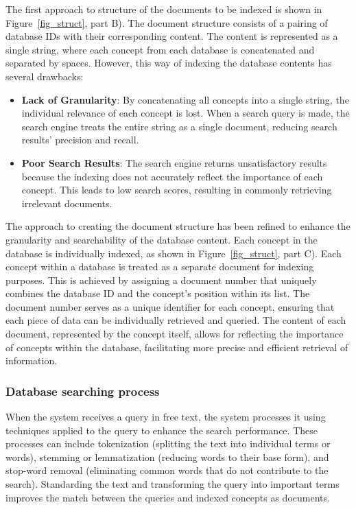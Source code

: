The first approach to structure of the documents to be indexed is shown in Figure~\ref{fig_struct}, part B). The document structure consists of a pairing of database IDs with their corresponding content. The content is represented as a single string, where each concept from each database is concatenated and separated by spaces. However, this way of indexing the database contents has several drawbacks: 

\begin{itemize}
    \item \textbf{Lack of Granularity}: By concatenating all concepts into a single string, the individual relevance of each concept is lost. When a search query is made, the search engine treats the entire string as a single document, reducing search results' precision and recall.
    \item \textbf{Poor Search Results}: The search engine returns unsatisfactory results because the indexing does not accurately reflect the importance of each concept. This leads to low search scores, resulting in commonly retrieving irrelevant documents.
\end{itemize}

The approach to creating the document structure has been refined to enhance the granularity and searchability of the database content. Each concept in the database is individually indexed, as shown in Figure~\ref{fig_struct}, part C). Each concept within a database is treated as a separate document for indexing purposes. This is achieved by assigning a document number that uniquely combines the database ID and the concept's position within its list. The document number serves as a unique identifier for each concept, ensuring that each piece of data can be individually retrieved and queried. The content of each document, represented by the concept itself, allows for reflecting the importance of concepts within the database, facilitating more precise and efficient retrieval of information.


\subsubsection{Database searching process}
\label{searchprocess}

When the {\ir} system receives a query in free text, the system processes it using {\nlp} techniques applied to the query to enhance the search performance. These processes can include tokenization (splitting the text into individual terms or words), stemming or lemmatization (reducing words to their base form), and stop-word removal (eliminating common words that do not contribute to the search). Standarding the text and transforming the query into important terms improves the match between the queries and indexed concepts as documents.

